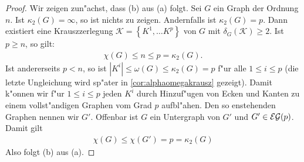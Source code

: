 \begin{proof}
  Wir zeigen zun"achst, dass (b) aus (a) folgt. Sei $G$ ein Graph der Ordnung $n$. Ist $\kappa_{2}(G) = \infty$, so ist nichts zu zeigen. Andernfalls ist $\kappa_{2}(G) =p$. Dann existiert eine Krauszzerlegung $\mathcal{K} = \left\{ K^1,\dots K^p \right\}$ von $G$ mit $\delta_G(\mathcal{K}) \geq 2$. Ist $p \geq n$, so gilt:
  \begin{align*}
    \chi(G) \leq n \leq p = \kappa_2 (G).
  \end{align*}
  Ist andererseits $p< n $, so ist $|K^{i}| \leq \omega (G)  \leq \kappa_2 (G) =  p$ f"ur alle $1\leq i \leq p$ (die letzte Ungleichung wird sp"ater in \ref{cor:alphaomegakrausz} gezeigt). Damit k"onnen wir f"ur $1\leq i \leq p$ jeden $K^{i}$ durch Hinzuf"ugen von Ecken und Kanten zu einem vollst"andigen Graphen vom Grad $p$ aufbl"ahen. Den so enstehenden Graphen nennen wir $G'$. Offenbar ist $G$ ein Untergraph von $G'$ und $G'\in {\cal EG}(p)$. Damit gilt 
  \begin{align*}
    \chi(G) \leq \chi (G') = p = \kappa_{2}(G)
  \end{align*}
  Also folgt (b) aus (a).  


\end{proof}
